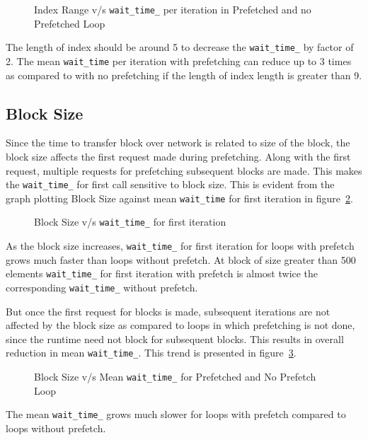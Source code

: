\begin{figure}[h]
  
  \caption{Index Range v/s \texttt{wait\_time\_} per iteration in Prefetched and no Prefetched Loop}
  \label{fig:p_np_mean}
\end{figure}

The length of index should be around 5 to decrease the \texttt{wait\_time\_}
by factor of 2. The mean \texttt{wait\_time} per iteration with prefetching can
reduce up to 3 times as compared to with no prefetching if the length of index
length is greater than 9.

\subsection{Block Size}
Since the time to transfer block over network is related to size of the block, the
block size affects the first request made during prefetching. Along with the first
request, multiple requests for prefetching subsequent blocks are made. This makes
the \texttt{wait\_time\_} for first call sensitive to block size. This is evident
from the graph plotting Block Size against mean \texttt{wait\_time} for first
iteration in figure~\ref{fig:first_wait_time}.
\begin{figure}[h]
  
  \caption{Block Size v/s \texttt{wait\_time\_} for first iteration}
  \label{fig:first_wait_time}
\end{figure}

As the block size increases, \texttt{wait\_time\_} for first iteration for loops
with prefetch grows much faster than loops without prefetch. At block of size
greater than 500 elements \texttt{wait\_time\_} for first iteration with prefetch
is almost twice the corresponding \texttt{wait\_time\_} without prefetch.

But once the first request for blocks is made, subsequent iterations are not affected
by the block size as compared to loops in which prefetching is not done, since the
runtime need not block for subsequent blocks. This results in overall reduction
in mean \texttt{wait\_time\_}. This trend is presented in figure~\ref{fig:block_size_avg_wait_time}.
\begin{figure}[h]
  
  \caption{Block Size v/s Mean \texttt{wait\_time\_} for Prefetched and No Prefetch Loop}
  \label{fig:block_size_avg_wait_time}
\end{figure}

The mean \texttt{wait\_time\_} grows much slower for loops with prefetch compared
to loops without prefetch.

